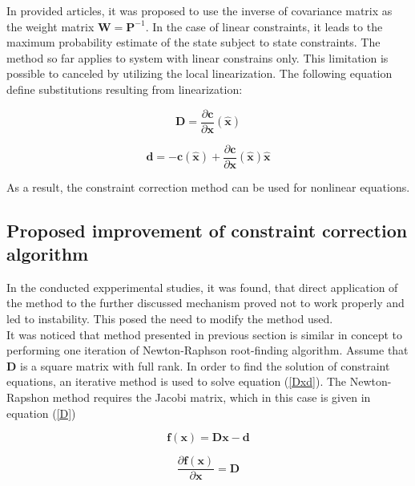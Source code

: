 In provided articles, it was proposed to use the inverse of covariance matrix as the weight matrix  $\bm{W} = \bm{P}^{-1}$. In the case of linear constraints, it leads to the maximum probability estimate of the state subject to state constraints. The method so far applies to system with linear constrains only. This limitation is possible to canceled by utilizing the local linearization. The following equation define substitutions resulting from linearization:

\begin{equation}
	\bm{D} = \frac{\partial \bm{c}}{\partial \bm{x}}(\bm{\hat{x}})
	\label{linearization1}
\end{equation}

\begin{equation}
	\bm{d} =  - \bm{c} (\bm{\hat{x}}) +  \frac{\partial \bm{c}}{\partial \bm{x}}(\bm{\hat{x}}) \bm{\hat{x}}
	\label{linearization2}
\end{equation}

As a result, the constraint correction method can be used for nonlinear equations.\\ 

\subsection{Proposed improvement of constraint correction algorithm}
In the conducted expperimental studies, it was found, that direct application of the method to the further discussed mechanism proved not to work properly and led to instability. This posed the need to modify the method used.\\

It was noticed that method presented in previous section is similar in concept to performing one iteration of Newton-Raphson root-finding algorithm. Assume that $\bm{D}$ is a square matrix with full rank. In order to find the solution of constraint equations, an iterative method is used to solve equation (\ref{Dxd}). The Newton-Rapshon method requires the Jacobi matrix, which in this case is given in equation (\ref{D})

\begin{equation}
	\bm{f} \left( \bm{x} \right) = \bm{D} \bm{x} - \bm{d} 
	\label{Dxd}
\end{equation}

\begin{equation}
	\frac{\partial \bm{f} \left( \bm{x} \right)}{\partial \bm{x}} = \bm{D}
	\label{D}
\end{equation}

